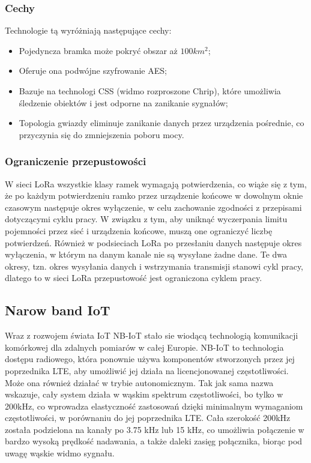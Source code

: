 \documentclass[12pt, a4paper, twoside]{report}
\begin{document}
\subsubsection{Cechy}
\hspace{1cm}Technologie tą wyróżniają następujące cechy:
\begin{itemize}
  \item Pojedyncza bramka może pokryć obszar aż $100km^2$;
  \item Oferuje ona podwójne szyfrowanie AES;
  \item Bazuje na technologi CSS (widmo rozproszone Chrip), które umożliwia śledzenie obiektów i jest odporne na zanikanie sygnałów;
  \item Topologia gwiazdy eliminuje zanikanie danych przez urządzenia pośrednie, co przyczynia się do zmniejszenia poboru mocy. \cite{LoRa-article}
\end{itemize}


\subsubsection{Ograniczenie przepustowości}
\hspace{1cm}W sieci LoRa wszystkie klasy ramek wymagają potwierdzenia, co wiąże się z tym, że po każdym potwierdzeniu ramko przez urządzenie końcowe w dowolnym oknie czasowym następuje okres wyłączenie, w celu zachowanie zgodności z przepisami dotyczącymi cyklu pracy. W związku z tym, aby uniknąć wyczerpania limitu pojemności przez sieć i urządzenia końcowe, muszą one ograniczyć liczbę potwierdzeń. Również w podsieciach LoRa po przesłaniu danych następuje okres wyłączenia, w którym na danym kanale nie są wysyłane żadne dane. Te dwa okresy, tzn. okres wysyłania danych i wstrzymania transmisji stanowi cykl pracy, dlatego  to w sieci LoRa przepustowość jest ograniczona cyklem pracy.\cite{LoRa-article}

\subsection{Narow band IoT}
\hspace{1cm}Wraz z rozwojem świata IoT NB-IoT stało sie wiodącą technologią komunikacji komórkowej dla zdalnych pomiarów w całej Europie. NB-IoT to technologia dostępu radiowego, która ponownie używa komponentów stworzonych przez jej poprzednika LTE, aby umożliwić jej działa na licencjonowanej częstotliwości. Może ona również działać w trybie autonomicznym. Tak jak sama nazwa wskazuje, cały system działa w wąskim spektrum częstotliwości, bo tylko w 200kHz, co wprowadza elastyczność zastosowań dzięki minimalnym wymaganiom częstotliwości, w porównaniu do jej poprzednika LTE. Cała szerokość 200kHz została podzielona na kanały po 3.75 kHz lub 15 kHz, co umożliwia połączenie w bardzo wysoką prędkość nadawania, a także daleki zasięg połącznika, biorąc pod uwagę wąskie widmo sygnału. \cite{nbiot-article}  
\end{document}
